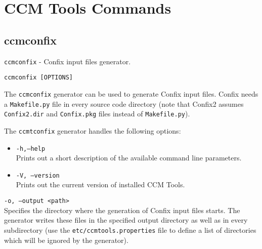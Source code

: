 
\chapter{CCM Tools Commands}

\section{ccmconfix}
\begin{description}

\item [NAME:] 
  {\tt ccmconfix} - Confix input files generator.

\item [SYNOPSIS:] 
  {\tt ccmconfix [OPTIONS]}

\item [DESCRIPTION:]
The {\tt ccmconfix} generator can be used to generate Confix input files.
Confix needs a {\tt Makefile.py} file in every source code directory (note that
Confix2 assumes {\tt Confix2.dir} and {\tt Confix.pkg} files instead of {\tt Makefile.py}).

\item [OPTIONS:]
  The {\tt ccmtconfix} generator handles the following options:
  \begin{itemize}
  \item {\tt -h,--help} \\
    Prints out a short description of the available command line parameters.

  \item {\tt -V, --version} \\
    Prints out the current version of installed CCM Tools.
  \end{itemize}

  \item {\tt -o, --output <path> } \\
    Specifies the directory where the generation of Confix input files starts.
    The generator writes these files in the specified output directory as well
    as in every subdirectory (use the {\tt etc/ccmtools.properties} file to
    define a list of directories which will be ignored by the generator).


\end{description}
